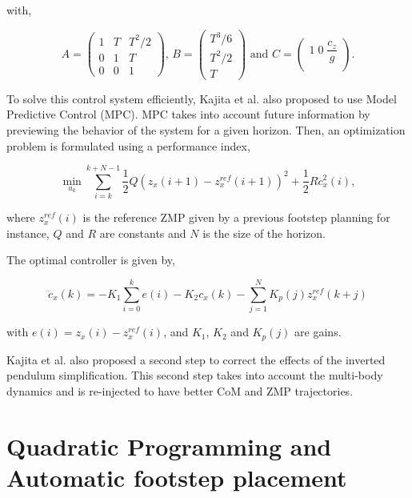 with,

\begin{equation*}
 A = \left(
\begin{matrix}
1 & T & T^2/2 \\
0 & 1 & T \\
0 & 0 & 1
\end{matrix}
\right) \text{, }
{ B} = \left(
\begin{matrix}
T^3/6 \\
T^2/2 \\
T
\end{matrix}
\right) \text{ and }
{ C} = \left(
\begin{matrix}
1 \; 0 \; \dfrac{c_z}{g} \\
\end{matrix}
\right).
\end{equation*}

To solve this control system efficiently, Kajita et al. also  proposed to use Model Predictive Control (MPC). MPC takes into account future information by previewing the behavior of the system for a given horizon. Then, an optimization problem is formulated using a performance index,

\begin{equation}
\min_{u_k} \sum\limits_{i=k}^{k+N - 1} \frac{1}{2} Q (z_x(i+1) - z_x^{ref}(i+1))^2 + \frac{1}{2}R\dddot{c}_x^2(i),
\end{equation}

where $z_x^{ref}(i)$ is the reference ZMP given by a previous footstep planning for instance, $Q$ and $R$ are constants and $N$ is the size of the horizon.

The optimal controller is given by,

\begin{equation}
\dddot{c}_x(k) = -K_1 \sum\limits_{i=0}^{k} e(i)-K_2c_x(k) - \sum\limits_{j=1}^{N} K_p(j)z_x^{ref}(k+j)
\end{equation}

with $e(i) = z_x(i) - z_x^{ref}(i)$, and $K_1$, $K_2$ and $K_p(j)$ are gains.

Kajita et al. also proposed a second step to correct the effects of the inverted pendulum simplification. This second step takes into account the multi-body dynamics and is re-injected to have better CoM and ZMP trajectories.

\section{Quadratic Programming and Automatic footstep placement}

